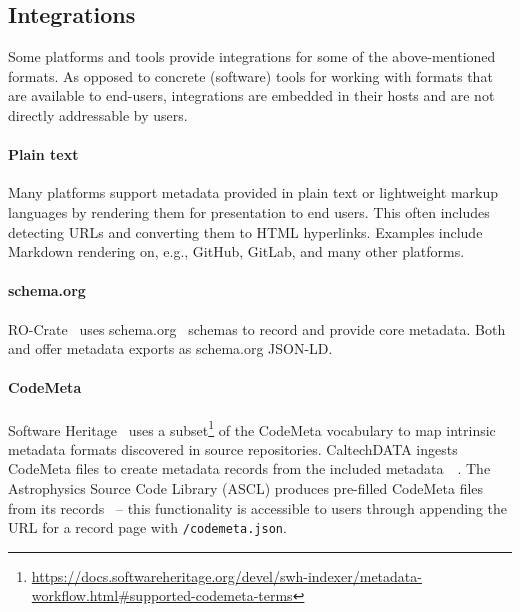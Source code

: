 \documentclass[11pt,a4paper]{scrartcl}
\newcommand{\fn}[1]{\texttt{#1}}
\begin{document}
\subsection{Integrations}\label{subsec:metadata-integrations}
Some platforms and tools provide integrations for some of the above-mentioned formats. As opposed to concrete (software)
tools for working with formats that are available to end-users, integrations are embedded in their hosts and are not
directly addressable by users.

\paragraph{Plain text}\label{par:metadata-integrations-plaintext}
Many platforms support metadata provided in plain text or light\-weight markup languages by rendering them for presentation
to end users. This often includes detecting URLs and converting them to HTML hyperlinks. Examples include Markdown
rendering on, e.g., GitHub, GitLab, and many other platforms.

\paragraph{schema.org}\label{par:metadata-integrations-schemaorg}  
RO-Crate~\cite{RO-Crate} uses schema.org~\cite{SchemaOrg} schemas to record and provide core metadata. Both  and
 offer metadata exports as schema.org JSON-LD.

\paragraph{CodeMeta}\label{par:metadata-integrations-codemeta}
Software Heritage~\cite{SWHArchive} uses a subset\footnote{\url{https://docs.softwareheritage.org/devel/swh-indexer/metadata-workflow.html\#supported-codemeta-terms}}
of the CodeMeta vocabulary to map intrinsic metadata formats discovered in source repositories.
CaltechDATA ingests CodeMeta files to create metadata records from the included metadata~\cite{ASCL-CaltechAMES}~\cite{sw:AMES}.
The Astrophysics Source Code Library (ASCL) produces pre-filled Code\-Meta files from its records~\cite{ASCL-Software-Citation} --
this functionality is accessible to users through appending the URL for a record page with \fn{/codemeta.json}.
\end{document}
